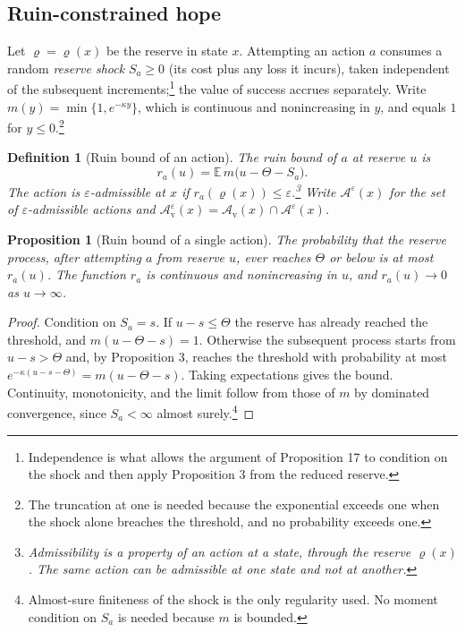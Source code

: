 \documentclass[11pt]{article}
\newtheorem{definition}{Definition}
\newtheorem{proposition}{Proposition}
\theoremstyle{remark}
\newcommand{\E}{\mathbb{E}}
\begin{document}
\subsection{Ruin-constrained hope}

Let $\varrho=\varrho(x)$ be the reserve in state $x$. Attempting an action $a$ consumes a random \emph{reserve shock} $S_a\ge0$ (its cost plus any loss it incurs), taken independent of the subsequent increments;\footnote{Independence is what allows the argument of Proposition 17 to condition on the shock and then apply Proposition 3 from the reduced reserve.} the value of success accrues separately. Write $m(y)=\min\{1,e^{-\kappa y}\}$, which is continuous and nonincreasing in $y$, and equals $1$ for $y\le0$.\footnote{The truncation at one is needed because the exponential exceeds one when the shock alone breaches the threshold, and no probability exceeds one.}

\begin{definition}[Ruin bound of an action]
The \emph{ruin bound} of $a$ at reserve $u$ is
\[
r_a(u)=\E\,m\bigl(u-\Theta-S_a\bigr).
\]
The action is \emph{$\varepsilon$-admissible} at $x$ if $r_a(\varrho(x))\le\varepsilon$.\footnote{Admissibility is a property of an action at a state, through the reserve $\varrho(x)$. The same action can be admissible at one state and not at another.} Write $\mathcal A^\varepsilon(x)$ for the set of $\varepsilon$-admissible actions and $\mathcal A^\varepsilon_{\mathrm v}(x)=\mathcal A_{\mathrm v}(x)\cap\mathcal A^\varepsilon(x)$.
\end{definition}

\begin{proposition}[Ruin bound of a single action]
The probability that the reserve process, after attempting $a$ from reserve $u$, ever reaches $\Theta$ or below is at most $r_a(u)$. The function $r_a$ is continuous and nonincreasing in $u$, and $r_a(u)\to0$ as $u\to\infty$.
\end{proposition}

\begin{proof}
Condition on $S_a=s$. If $u-s\le\Theta$ the reserve has already reached the threshold, and $m(u-\Theta-s)=1$. Otherwise the subsequent process starts from $u-s>\Theta$ and, by Proposition 3, reaches the threshold with probability at most $e^{-\kappa(u-s-\Theta)}=m(u-\Theta-s)$. Taking expectations gives the bound. Continuity, monotonicity, and the limit follow from those of $m$ by dominated convergence, since $S_a<\infty$ almost surely.\footnote{Almost-sure finiteness of the shock is the only regularity used. No moment condition on $S_a$ is needed because $m$ is bounded.}
\end{proof}
\end{document}
